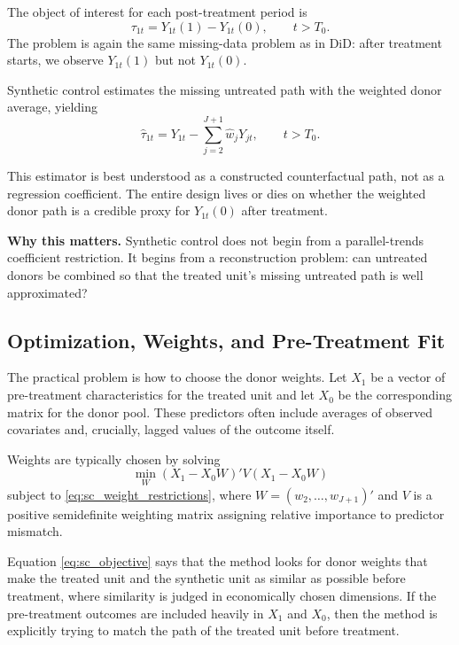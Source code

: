 The object of interest for each post-treatment period is
\begin{equation}
\tau_{1t}
=
Y_{1t}(1)-Y_{1t}(0),
\qquad t > T_0.
\label{eq:sc_treatment_effect}
\end{equation}
The problem is again the same missing-data problem as in \ac{DiD}: after treatment starts, we observe $Y_{1t}(1)$ but not $Y_{1t}(0)$.

Synthetic control estimates the missing untreated path with the weighted donor average, yielding
\begin{equation}
\hat{\tau}_{1t}
=
Y_{1t} - \sum_{j=2}^{J+1}\hat{w}_j Y_{jt},
\qquad t > T_0.
\label{eq:sc_effect_estimator}
\end{equation}

This estimator is best understood as a constructed counterfactual path, not as a regression coefficient. The entire design lives or dies on whether the weighted donor path is a credible proxy for $Y_{1t}(0)$ after treatment.

\begin{boxD}
\textbf{Why this matters.}
Synthetic control does not begin from a parallel-trends coefficient restriction. It begins from a reconstruction problem: can untreated donors be combined so that the treated unit's missing untreated path is well approximated?
\end{boxD}

\subsection{Optimization, Weights, and Pre-Treatment Fit}
The practical problem is how to choose the donor weights. Let $X_1$ be a vector of pre-treatment characteristics for the treated unit and let $X_0$ be the corresponding matrix for the donor pool. These predictors often include averages of observed covariates and, crucially, lagged values of the outcome itself.

Weights are typically chosen by solving
\begin{equation}
\min_{W} (X_1 - X_0W)'V(X_1 - X_0W)
\label{eq:sc_objective}
\end{equation}
subject to \eqref{eq:sc_weight_restrictions}, where $W=(w_2,\ldots,w_{J+1})'$ and $V$ is a positive semidefinite weighting matrix assigning relative importance to predictor mismatch.

Equation \eqref{eq:sc_objective} says that the method looks for donor weights that make the treated unit and the synthetic unit as similar as possible before treatment, where similarity is judged in economically chosen dimensions. If the pre-treatment outcomes are included heavily in $X_1$ and $X_0$, then the method is explicitly trying to match the path of the treated unit before treatment.

